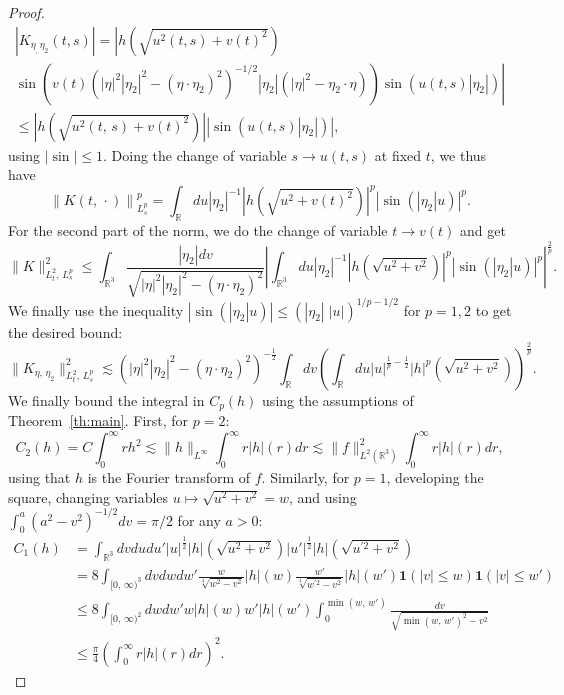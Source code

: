 \documentclass[AHL, Unicode, longabstracts,published]{cedram}
\newcommand{\R}{\mathbb{R}}
\newcommand{\bfun}{\mathbf{1}}
\begin{document}
\begin{proof}
\begin{multline*}
\left|K_{\eta_,\,\eta_2}(t,s)\right| 
=\left|h\left(\sqrt{u^2(t,s)+v(t)^2}\right)\right.\\
\left.\sin\left(v(t)\left(|\eta|^2|\eta_2|^2- \left(\eta\cdot\eta_2\right)^2\right)^{-1/2}|\eta_2|\left(|\eta|^2-\eta_2\cdot \eta\right)\right) \sin\left(u(t,s)|\eta_2|\right)\right|\\
\leq \left|h\left(\sqrt{u^2(t,\,s)+v(t)^2}\right)\right| \left|\sin\left(u(t,s)|\eta_2|\right)\right|,
\end{multline*}
using $|\sin|\leq 1$. Doing the change of variable $s \rightarrow u(t,s)$ at fixed $t$, we thus have
\[
\left\|K(t,\,\cdot)\right\|_{L^p_s}^p = \int_{\R} du |\eta_2|^{-1} \left|h\left(\sqrt{u^2+ v(t)^2}\right)\right|^p \left|\sin\left(|\eta_2| u\right)\right|^p.
\]
For the second part of the norm, we do the change of variable $t\rightarrow v(t)$ and get
\[
\|K\|_{L^2_t,\,L^p_s}^2 \leq \int_{\R^3} \frac{|\eta_2|dv}{\sqrt{|\eta|^2|\eta_2|^2- \left(\eta\cdot\eta_2\right)^2}} \left| \int_{\R^3} du |\eta_2|^{-1}\left|h\left(\sqrt{u^2+v^2}\right)\right|^p \left|\sin \left(|\eta_2|u\right)\right|^p \right|^{\frac 2p}.
\]
We finally use the inequality $|\sin (|\eta_2|u)| \leq (|\eta_2| \;|u|)^{1/p-1/2}$ for $p=1,2$ to get the desired bound:
\[
\big\|K_{\eta,\,\eta_2}\big\|_{L^2_t,\,L^p_s}^2 \lesssim \left(|\eta|^2|\eta_2|^2 - \left(\eta\cdot\eta_2\right)^2\right)^{-\frac 12}\int_{\R} dv \left(\int_{\R} du |u|^{\frac 1p-\frac 12}\left|h\right|^p\left(\sqrt{u^2+v^2}\right) \right)^{\frac 2p}.
\]
We finally bound the integral in $C_p(h)$ using the assumptions of Theorem~\ref{th:main}. First, for $p=2$:
\[
C_2(h)=C \int_0^\infty r h^2\lesssim \| h \|_{L^{\infty}}\int_0^\infty r|h|(r)dr \lesssim \| f\|_{L^2(\R^3)}^2\int_0^\infty r|h|(r)dr,
\]
using that $h$ is the Fourier transform of $f$. Similarly, for $p=1$, developing the square, changing variables $u\mapsto \sqrt{u^2+v^2}=w$, and using $\int_0^a (a^2-v^2)^{-1/2}dv=\pi/2$ for any $a>0$:
\begin{align*}
 C_1(h)&=\int_{\R^3} dvdudu' |u|^{\frac 12}|h|\left(\sqrt{u^2+v^2}\right)|u'|^{\frac 12}|h|\left(\sqrt{u^{'2}+v^2}\right)\\
&= 8 \int_{[0,\,\infty)^3} dvdwdw' \frac{w}{\sqrt[4]{w^2-v^2}}|h|(w)\frac{w'}{\sqrt[4]{w^{'2}-v^2}}|h|(w')\bfun(|v|\leq w)\bfun(|v|\leq w')\\
&\leq 8 \int_{[0,\,\infty)^2} dwdw' w|h|(w)w'|h|(w') \int_0^{\min(w,\,w')}\frac{dv}{\sqrt{\min(w,\,w')^2-v^2}}\\
&\leq \frac{\pi}{4} \left(\int_0^\infty r|h|(r)dr\right)^2.
\end{align*}
\end{proof}
\end{document}
